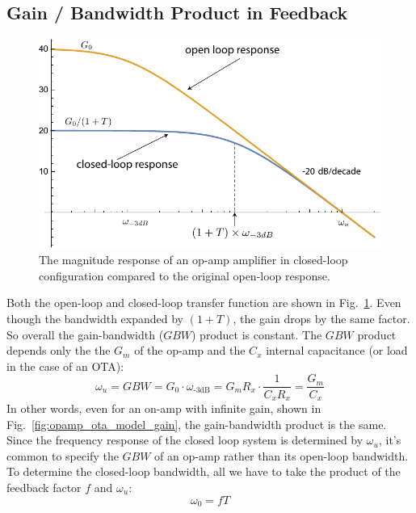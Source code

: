 \subsection{Gain / Bandwidth Product in Feedback}
\begin{figure}[tb]
\centering
\includegraphics[width=.7\columnwidth]{mag1pole_fb}
\caption{The magnitude response of an op-amp amplifier in closed-loop configuration compared to the original open-loop response.}
\label{fig:mag1pole_fb}
\end{figure}
Both the open-loop and closed-loop transfer function are shown in Fig.~\ref{fig:mag1pole_fb}.  Even though the bandwidth expanded by $(1+T)$, the gain drops by the same factor. So overall the gain-bandwidth ($GBW$) product is constant. The $GBW$ product depends only the the $G_m$ of the op-amp and the $C_x$ internal capacitance (or load in the case of an OTA):
    \begin{equation}
        \omega_u = GBW = G_0 \cdot \omega_{\text{-3dB}}  = G_m R_x \cdot \frac{1}{C_x R_x} = \frac{G_m}{C_x}
    \end{equation} 
In other words, even for an on-amp with infinite gain, shown in Fig.~\ref{fig:opamp_ota_model_gain}, the gain-bandwidth product is the same.  Since the frequency response of the closed loop system is determined by $\omega_u$, it's common to specify the $GBW$ of an op-amp rather than its open-loop bandwidth.  To determine the closed-loop bandwidth, all we have to take the product of the feedback factor $f$ and $\omega_u$:
    \begin{equation}
        \omega_0 = f T
    \end{equation} 
